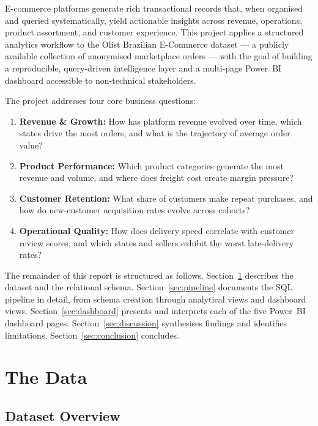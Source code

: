 \documentclass[12pt,a4paper]{article}
\begin{document}
E-commerce platforms generate rich transactional records that, when organised and queried
systematically, yield actionable insights across revenue, operations, product assortment, and
customer experience. This project applies a structured analytics workflow to the Olist
Brazilian E-Commerce dataset — a publicly available collection of anonymised marketplace
orders — with the goal of building a reproducible, query-driven intelligence layer and a
multi-page Power~BI dashboard accessible to non-technical stakeholders.

The project addresses four core business questions:

\begin{enumerate}
    \item \textbf{Revenue \& Growth:} How has platform revenue evolved over time, which
          states drive the most orders, and what is the trajectory of average order value?
    \item \textbf{Product Performance:} Which product categories generate the most revenue
          and volume, and where does freight cost create margin pressure?
    \item \textbf{Customer Retention:} What share of customers make repeat purchases, and
          how do new-customer acquisition rates evolve across cohorts?
    \item \textbf{Operational Quality:} How does delivery speed correlate with customer
          review scores, and which states and sellers exhibit the worst late-delivery rates?
\end{enumerate}

The remainder of this report is structured as follows. Section~\ref{sec:data} describes the
dataset and the relational schema. Section~\ref{sec:pipeline} documents the SQL pipeline in
detail, from schema creation through analytical views and dashboard views. Section~\ref{sec:dashboard} presents and interprets each of the five Power~BI dashboard pages.
Section~\ref{sec:discussion} synthesises findings and identifies limitations.
Section~\ref{sec:conclusion} concludes.

\section{The Data}
\label{sec:data}

\subsection{Dataset Overview}
\end{document}
